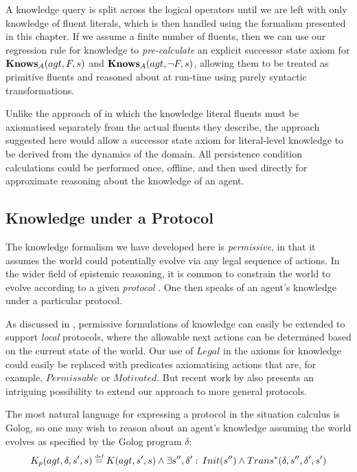 A knowledge query is split across the logical operators until we are
left with only knowledge of fluent literals, which is then handled
using the formalism presented in this chapter. If we assume a finite
number of fluents, then we can use our regression rule for knowledge
to \emph{pre-calculate} an explicit successor state axiom for $\mathbf{Knows}_{A}(agt,F,s)$
and $\mathbf{Knows}_{A}(agt,\neg F,s)$, allowing them to be treated as primitive
fluents and reasoned about at run-time using purely syntactic transformations.

Unlike the approach of \citep{demolombe00tractable_sc_belief} in
which the knowledge literal fluents must be axiomatised separately
from the actual fluents they describe, the approach suggested here
would allow a successor state axiom for literal-level knowledge to
be derived from the dynamics of the domain. All persistence condition
calculations could be performed once, offline, and then used directly
for approximate reasoning about the knowledge of an agent.


\subsection{Knowledge under a Protocol}

The knowledge formalism we have developed here is \emph{permissive},
in that it assumes the world could potentially evolve via any legal
sequence of actions. In the wider field of epistemic reasoning, it
is common to constrain the world to evolve according to a given \emph{protocol}
\citep{halpern90knowledge_distrib,fagin95,vanBentham06tree_of_knowledge}.
One then speaks of an agent's knowledge under a particular protocol.

As discussed in \citep{vanBentham06tree_of_knowledge}, permissive
formulations of knowledge can easily be extended to support \emph{local}
protocols, where the allowable next actions can be determined based
on the current state of the world. Our use of $Legal$ in the axioms
for knowledge could easily be replaced with predicates axiomatising
actions that are, for example, $Permissable$ or $Motivated$. But
recent work by \citet{fritz08congolog_sin_trans} also presents an
intriguing possibility to extend our approach to more general protocols.

The most natural language for expressing a protocol in the situation
calculus is Golog, so one may wish to reason about an agent's knowledge
assuming the world evolves as specified by the Golog program $\delta$:\[
K_{p}(agt,\delta,s',s)\stackrel{\mbox{\tiny def}}{=} K(agt,s',s)\wedge\exists s'',\delta':\, Init(s'')\wedge Trans^{*}(\delta,s'',\delta',s')\]


